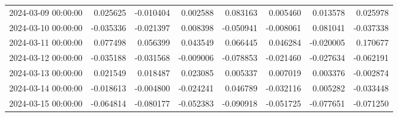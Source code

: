 \begin{tabular}{lrrrrrrr}
2024-03-09 00:00:00 & 0.025625 & -0.010404 & 0.002588 & 0.083163 & 0.005460 & 0.013578 & 0.025978 \\
2024-03-10 00:00:00 & -0.035336 & -0.021397 & 0.008398 & -0.050941 & -0.008061 & 0.081041 & -0.037338 \\
2024-03-11 00:00:00 & 0.077498 & 0.056399 & 0.043549 & 0.066445 & 0.046284 & -0.020005 & 0.170677 \\
2024-03-12 00:00:00 & -0.035188 & -0.031568 & -0.009006 & -0.078853 & -0.021460 & -0.027634 & -0.062191 \\
2024-03-13 00:00:00 & 0.021549 & 0.018487 & 0.023085 & 0.005337 & 0.007019 & 0.003376 & -0.002874 \\
2024-03-14 00:00:00 & -0.018613 & -0.004800 & -0.024241 & 0.046789 & -0.032116 & 0.005282 & -0.033448 \\
2024-03-15 00:00:00 & -0.064814 & -0.080177 & -0.052383 & -0.090918 & -0.051725 & -0.077651 & -0.071250 \\
\bottomrule
\end{tabular}
